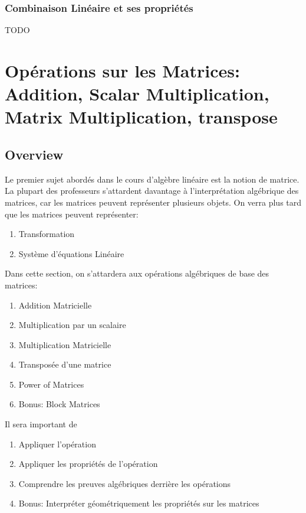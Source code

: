 \documentclass{article}
\begin{document}
\subsubsection{Combinaison Linéaire et ses propriétés}%
\label{ssub:Combinaison Linéaire et ses propriétés}

\begin{definition}
    TODO
\end{definition}

\section{Opérations sur les Matrices: Addition, Scalar Multiplication,
Matrix Multiplication, transpose}

\subsection{Overview}%
\label{sub:Overview}

Le premier sujet abordés dans le cours d'algèbre linéaire est la notion
de matrice. La plupart des professeurs s'attardent davantage à l'interprétation
algébrique des matrices, car les matrices peuvent représenter plusieurs objets.
On verra plus tard que les matrices peuvent représenter:
\begin{enumerate}
    \item Transformation
    \item Système d'équations Linéaire
\end{enumerate}

Dans cette section, on s'attardera aux opérations algébriques de base des
matrices:
\begin{enumerate}
    \item Addition Matricielle
    \item Multiplication par un scalaire
    \item Multiplication Matricielle
    \item Transposée d'une matrice
    \item Power of Matrices
    \item Bonus: Block Matrices
\end{enumerate}

Il sera important de
\begin{enumerate}
    \item Appliquer l'opération
    \item Appliquer les propriétés de l'opération
    \item Comprendre les preuves algébriques derrière les opérations
    \item Bonus: Interpréter géométriquement les propriétés sur les matrices
\end{enumerate}
\end{document}
